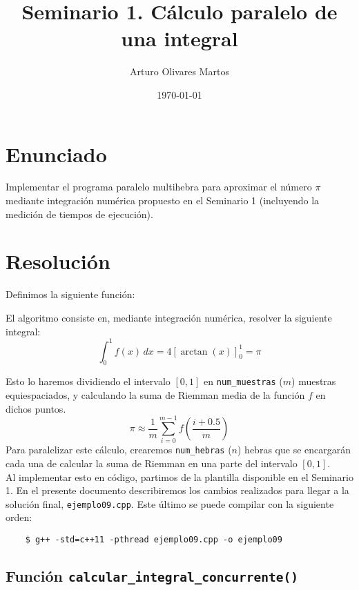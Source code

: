 \documentclass[12pt]{article}
\begin{document}
\title{Seminario 1. Cálculo paralelo de una integral}
\author{Arturo Olivares Martos}
\date{\today}

\maketitle
    
    
\section{Enunciado}
Implementar el programa paralelo multihebra para aproximar el número $\pi$ mediante integración numérica propuesto en el Seminario 1 (incluyendo la medición de tiempos de ejecución).

\section{Resolución}
Definimos la siguiente función:

El algoritmo consiste en, mediante integración numérica, resolver la siguiente integral:
\[
    \int_{0}^{1} f(x) \, dx = 4\left[\arctan(x)\right]_{0}^{1} = \pi
\]

Esto lo haremos dividiendo el intervalo $[0,1]$ en \verb|num_muestras| ($m$) muestras equiespaciados, y calculando la suma de Riemman media de la función $f$ en dichos puntos.
\begin{equation*}
    \pi \approx \frac{1}{m} \sum_{i=0}^{m-1} f\left(\frac{i+0.5}{m}\right) 
\end{equation*}
Para paralelizar este cálculo, crearemos \verb|num_hebras| ($n$) hebras que se encargarán cada una de calcular la suma de Riemman en una parte del intervalo $[0,1]$.\\

Al implementar esto en código, partimos de la plantilla disponible en el Seminario 1.
En el presente documento describiremos los cambios realizados para llegar a la solución final, \verb|ejemplo09.cpp|.
Este último se puede compilar con la siguiente orden:
\begin{verbatim}
    $ g++ -std=c++11 -pthread ejemplo09.cpp -o ejemplo09
\end{verbatim}


\subsection{Función \texttt{calcular_integral_concurrente()}}
\end{document}
